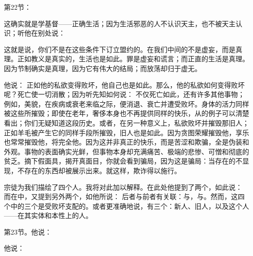 第22节：\par

这确实就是学基督——正确生活；因为生活邪恶的人不认识天主，也不被天主认识；听他在别处说：\par

\par

这就是说，你们不是在这些条件下订立盟约的。在我们中间的不是虚妄，而是真理。正如教义是真实的，生活也是如此。罪是虚妄和谎言；而正直的生活是真理。因为节制确实是真理，因为它有伟大的结局；而放荡却归于虚无。\par

他说：  正如他的私欲变得败坏，他自己也是如此。那么，他的私欲如何变得败坏呢？死亡使一切消散；因为听先知如何说：  不仅死亡如此，还有许多其他事物；例如，美貌，在疾病或衰老来临之际，便消退、衰亡并遭受败坏。身体的活力同样被这些所摧毁；即使在老年，奢侈本身也不再提供同样的快乐，从的例子可以清楚看出；你们无疑知道这段历史。或者，在另一种意义上，私欲败坏并摧毁那旧人；正如羊毛被产生它的同样手段所摧毁，旧人也是如此。因为贪图荣耀摧毁他，享乐也常常摧毁他，将完全他。因为这并非真正的快乐，而是苦涩和欺骗，全是伪装和外观。事物的表面确实光鲜，但事物本身却充满痛苦、极端的悲惨、可憎和彻底的贫乏。摘下假面具，揭开真面目，你就会看到骗局，因为这是骗局：当存在的不显现，不存在的东西却被展示出来。就这样，欺诈得以施行。\par

宗徒为我们描绘了四个人。我将对此加以解释。在此处他提到了两个，如此说： 而在中，又提到另外两个，如他所说：  后者与前者有关联：与，与。然而，这四个中的三个是受败坏支配的。或者更准确地说，有三个：新人、旧人，以及这个人——在其实体和本性上的人。\par

第23节。他说： \par

他说： \par

